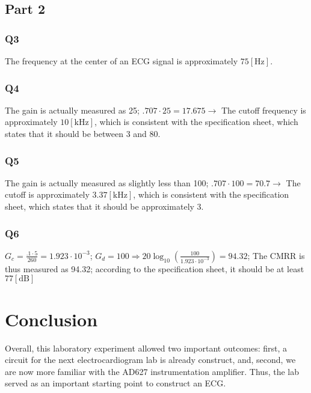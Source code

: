 \documentclass[
	letterpaper, %
	10pt, %
]{CSUniSchoolLabReport}
\begin{document}
\subsection{Part 2}

\subsubsection{Q3} The frequency at the center of an ECG signal is approximately $75[\si{\hertz}]$.

\subsubsection{Q4} The gain is actually measured as 25; $.707\cdot25=17.675\rightarrow$ The cutoff frequency is approximately $10[\si{\kilo\hertz}]$, which is consistent with the specification sheet, which states that it should be between 3 and 80.

\subsubsection{Q5} The gain is actually measured as slightly less than 100; $.707\cdot100=70.7\rightarrow$ The cutoff is approximately $3.37[\si{\kilo\hertz}]$, which is consistent with the specification sheet, which states that it should be approximately 3.

\subsubsection{Q6} $G_c=\frac{.1\cdot5}{260}=1.923\cdot10^{-3}$; $G_d=100\Rightarrow 20\log_{10}\left( \frac{100}{1.923\cdot10^{-3}} \right)=94.32$; The CMRR is thus measured as 94.32; according to the specification sheet, it should be at least $77[\text{dB}]$

\section{Conclusion}

Overall, this laboratory experiment allowed two important outcomes: first, a circuit for the next electrocardiogram lab is already construct, and, second, we are now more familiar with the AD627 instrumentation amplifier. Thus, the lab served as an important starting point to construct an ECG.
\end{document}
